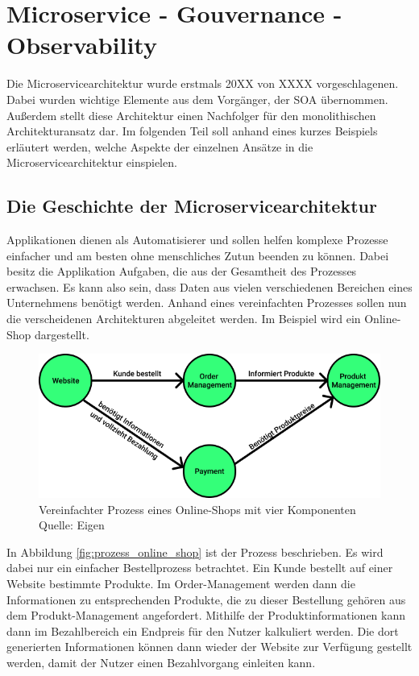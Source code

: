 \chapter{Microservice - Gouvernance - Observability}

Die Microservicearchitektur wurde erstmals 20XX von XXXX  vorgeschlagenen. Dabei wurden wichtige Elemente aus dem Vorgänger, der \ac{SOA} übernommen. Außerdem stellt diese Architektur einen Nachfolger für den monolithischen Architekturansatz dar. Im folgenden Teil soll anhand eines kurzes Beispiels erläutert werden, welche Aspekte der einzelnen Ansätze in die Microservicearchitektur einspielen.

\section{Die Geschichte der Microservicearchitektur}

Applikationen dienen als Automatisierer und sollen helfen komplexe Prozesse einfacher und am besten ohne menschliches Zutun beenden zu können. Dabei besitz die Applikation Aufgaben, die aus der Gesamtheit des Prozesses erwachsen. Es kann also sein, dass Daten aus vielen verschiedenen Bereichen eines Unternehmens benötigt werden. Anhand eines vereinfachten Prozesses sollen nun die verscheidenen Architekturen abgeleitet werden. Im Beispiel wird ein Online-Shop dargestellt.

\begin{figure}[h]
	\centering
	\includegraphics[width=1.0\linewidth]{img/prozess_eCommernce.png}
	\caption[Prozess Online-Shop]{Vereinfachter Prozess eines Online-Shops mit vier Komponenten\\ Quelle: Eigen}
	\label{fig:prozess_online_shop}
\end{figure}

In Abbildung \vref{fig:prozess_online_shop} ist der Prozess beschrieben. Es wird dabei nur ein einfacher Bestellprozess betrachtet. Ein Kunde bestellt auf einer Website bestimmte Produkte. Im Order-Management werden dann die Informationen zu entsprechenden Produkte, die zu dieser Bestellung gehören aus dem Produkt-Management angefordert. Mithilfe der Produktinformationen kann dann im Bezahlbereich ein Endpreis für den Nutzer kalkuliert werden. Die dort generierten Informationen können dann wieder der Website zur Verfügung gestellt werden, damit der Nutzer einen Bezahlvorgang einleiten kann.

